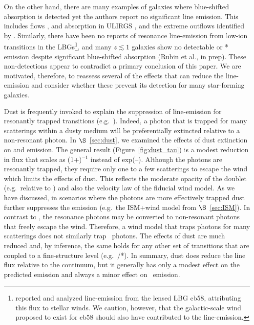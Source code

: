 \documentclass[12pt,preprint]{aastex}
\begin{document}
On the other hand,
there are many examples of galaxies where blue-shifted absorption is
detected yet the authors report no significant line emission.  This
includes  flows \citep{rvs05a,martin05,smn+09}, 
 and  absorption in
ULIRGS \citep{mb09}, and the extreme  outflows identified
by \cite{tmd07}.  Similarly, there have been no reports of
resonance line-emission from low-ion transitions in the
LBGs\footnote{\citet{psa+00}
  reported and analyzed  line-emission from the lensed LBG
  cb58, attributing this flux to stellar winds.  We caution, however,
  that the galactic-scale wind proposed to exist for cb58 should also
  have contributed to the  line-emission.}, and many
$z \lesssim 1$ galaxies show no detectable  or *
emission despite significant blue-shifted absorption (Rubin et al., in prep). 
These non-detections appear to contradict a primary conclusion of 
this paper.   We are motivated, therefore, to
reassess several of the effects that can reduce the line-emission
and consider whether these prevent its detection for many
star-forming galaxies.  

Dust is frequently invoked to explain the suppression of line-emission
for resonantly trapped transitions (e.g.\ \lya).  Indeed, a photon
that is trapped for many scatterings within a dusty medium will 
be preferentially extincted relative to a non-resonant photon.  In
$\S$~\ref{sec:dust}, we examined the effects of dust extinction on 
 and  emission.  The general result
(Figure~\ref{fig:dust_tau}) is a modest
reduction in flux that scales as (1+\taud)$^{-1}$ instead of
exp(--\taud). Although the  photons are resonantly
trapped, they require only one to a few scatterings
to escape the wind which limits the effects of
dust.  This reflects the moderate opacity of the 
doublet (e.g.\ relative to \lya) and also the velocity law of the
fiducial wind model.
As we have discussed, in scenarios where the  photons are
more effectively trapped dust further suppresses
the emission (e.g.\ the ISM+wind model from $\S$~\ref{sec:ISM}).
In contrast to , 
the  resonance photons may be
converted to non-resonant photons that freely escape the wind.
Therefore, a wind model that traps 
photons for many scatterings does not similarly trap 
\feiid\ photons.  The effects of dust are much 
reduced and, by inference, the same holds for any other set of
transitions that are coupled to a fine-structure level (e.g.\
/*).  In summary,
dust does reduce the line flux relative to the continuum, but 
it generally has only a modest effect on the predicted 
emission and always a minor effect on \feiis\ emission.
\end{document}
